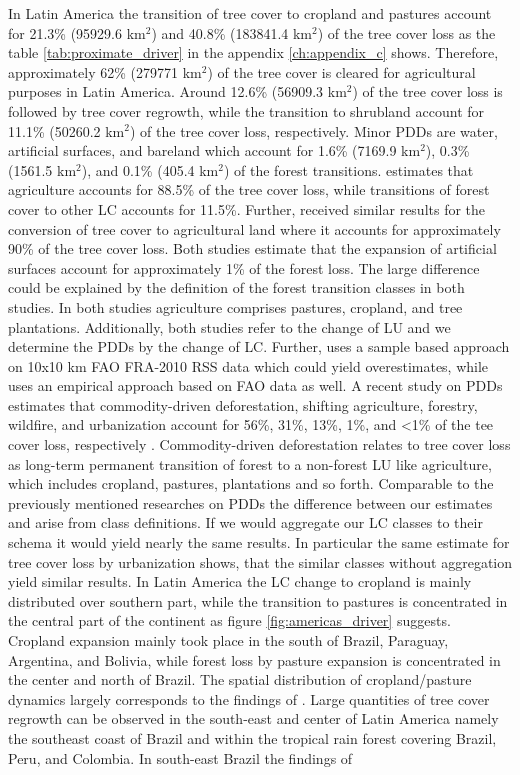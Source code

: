 			In Latin America the transition of tree cover to cropland and pastures account for 21.3\% (95929.6 km$^2$) and 40.8\% (183841.4 km$^2$) of the tree cover loss as the table \ref{tab:proximate_driver} in the appendix \ref{ch:appendix_c} shows. Therefore, approximately 62\% (279771 km$^2$) of the tree cover is cleared for agricultural purposes in Latin America. Around 12.6\% (56909.3 km$^2$) of the tree cover loss is followed by tree cover regrowth, while the transition to shrubland account for 11.1\% (50260.2 km$^2$) of the tree cover loss, respectively. Minor \acp{PDD} are water, artificial surfaces, and bareland which account for 1.6\% (7169.9 km$^2$), 0.3\% (1561.5 km$^2$), and 0.1\% (405.4 km$^2$) of the forest transitions. \citet{Sy2015} estimates that agriculture accounts for 88.5\% of the tree cover loss, while transitions of forest cover to other \ac{LC} accounts for 11.5\%. Further, \citet{Hosonuma2012} received similar results for the conversion of tree cover to agricultural land where it accounts for approximately 90\% of the tree cover loss. Both studies estimate that the expansion of artificial surfaces account for approximately 1\% of the forest loss. The large difference could be explained by the definition of the forest transition classes in both studies. In both studies agriculture comprises pastures, cropland, and tree plantations. Additionally, both studies refer to the change of \ac{LU} and we determine the \acp{PDD} by the change of \ac{LC}. Further, \citeauthor{Sy2015} uses a sample based approach on 10x10 km \ac{FAO} FRA-2010 RSS data which could yield overestimates, while \citeauthor{Hosonuma2012} uses an empirical approach based on \ac{FAO} data as well. A recent study on \acp{PDD} estimates that commodity-driven deforestation, shifting agriculture, forestry, wildfire, and urbanization account for 56\%, 31\%, 13\%, 1\%, and <1\% of the tee cover loss, respectively \citep{Curtis2018}. Commodity-driven deforestation relates to tree cover loss as long-term permanent transition of forest to a non-forest \ac{LU} like agriculture, which includes cropland, pastures, plantations and so forth. Comparable to the previously mentioned researches on \acp{PDD} the difference between our estimates and \citeauthor{Curtis2018} arise from class definitions. If we would aggregate our \ac{LC} classes to their schema it would yield nearly the same results. In particular the same estimate for tree cover loss by urbanization shows, that the similar classes without aggregation yield similar results. In Latin America the \ac{LC} change to cropland is mainly distributed over southern part, while the transition to pastures is concentrated in the central part of the continent as figure \ref{fig:americas_driver} suggests. Cropland expansion mainly took place in the south of Brazil, Paraguay, Argentina, and Bolivia, while forest loss by pasture expansion is concentrated in the center and north of Brazil. The spatial distribution of cropland/pasture dynamics largely corresponds to the findings of \citet{Graesser2015}. Large quantities of tree cover regrowth can be observed in the south-east and center of Latin America namely the southeast coast of Brazil and within the tropical rain forest covering Brazil, Peru, and Colombia. In south-east Brazil the findings of 